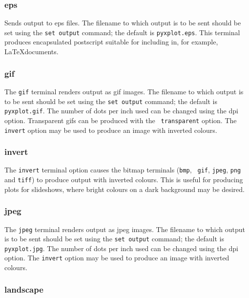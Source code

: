 \subsubsection{eps}

Sends output to eps files.  The filename to which output is to be sent should
be set using the {\tt set output} command; the default is
{\tt pyxplot.eps}.  This terminal produces encapsulated postscript
suitable for including in, for example, \LaTeX documents.


\subsubsection{gif}

The {\tt gif} terminal renders output as gif images. The filename to which
output is to be sent should be set using the {\tt set output} command; the
default is {\tt pyxplot.gif}. The number of dots per inch used can be changed
using the dpi option. Transparent gifs can be produced with the {\tt
transparent} option. The {\tt invert} option may be used to produce an image
with inverted colours.


\subsubsection{invert}

The {\tt invert} terminal option causes the bitmap terminals ({\tt bmp}, {\tt
gif}, {\tt jpeg}, {\tt png} and {\tt tiff}) to produce output with inverted
colours. This is useful for producing plots for slideshows, where bright
colours on a dark background may be desired.


\subsubsection{jpeg}

The {\tt jpeg} terminal renders output as jpeg images. The filename to which
output is to be sent should be set using the {\tt set output} command; the
default is {\tt pyxplot.jpg}.  The number of dots per inch used can be changed
using the dpi option. The {\tt invert} option may be used to produce an
image with inverted colours.


\subsubsection{landscape}

